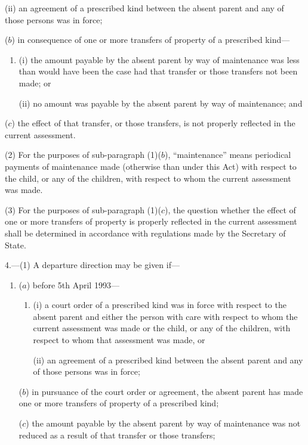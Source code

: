 \documentclass[12pt,a4paper]{article}
\begin{document}
{\begin{enumerate}
\begin{enumerate}
(ii) an agreement of a prescribed kind between the absent parent and any of
those persons was in force;
\end{enumerate}

($b$) in consequence of one or more transfers of property of a prescribed kind---
\begin{enumerate}\item[]
(i) the amount payable by the absent parent by way of maintenance was
less than would have been the case had that transfer or those transfers
not been made; or

(ii) no amount was payable by the absent parent by way of maintenance;
and
\end{enumerate}

($c$) the effect of that transfer, or those transfers, is not properly reflected in the
current assessment.
\end{enumerate}

(2)
For the purposes of sub-paragraph (1)($b$), “maintenance” means periodical payments of maintenance made (otherwise than under this Act) with respect to the child, or any of the children, with respect to whom the current assessment was made.

(3)
For the purposes of sub-paragraph (1)($c$), the question whether the effect of one or more transfers of property is properly reflected in the current assessment shall be determined in accordance with regulations made by the Secretary of State.

\medskip

4.—(1) A departure direction may be given if---
\begin{enumerate}\item[]
($a$) before 5th April 1993---
\begin{enumerate}\item[]
(i) a court order of a prescribed kind was in force with respect to the absent parent and either the person with care with respect to whom the current assessment was made or the child, or any of the children, with respect to whom that assessment was made, or

(ii) an agreement of a prescribed kind between the absent parent and any of those persons was in force;
\end{enumerate}

($b$) in pursuance of the court order or agreement, the absent parent has made one or more transfers of property of a prescribed kind;

($c$) the amount payable by the absent parent by way of maintenance was not reduced as a result of that transfer or those transfers;


\end{enumerate}}
\end{document}
